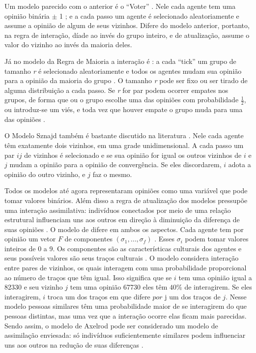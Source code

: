   Um modelo parecido com o anterior é o ``Voter'' \cite{holley1975ergodic}. Nele
  cada agente tem uma opinião binária \(\pm\) 1 ; e a cada passo um agente é
  selecionado aleatoriamente e assume a opinião de algum de seus vizinhos.
  Difere do modelo anterior, portanto, na regra de interação, díade ao invés do
  grupo inteiro, e de atualização, assume o valor do vizinho ao invés da maioria
  deles.


  Já no modelo da Regra de Maioria  a interação é : a cada
  ``tick'' um grupo de tamanho \textit{r} é selecionado aleatoriamente e todos
  os agentes mudam sua opinião para a opinião da maioria do grupo
  \cite{galam1990social,galam2012sociophysics}. O tamanho \textit{r} pode ser
  fixo ou ser tirado de alguma distribuição a cada passo. Se \textit{r} for par
  podem ocorrer empates nos grupos, de forma que ou o grupo escolhe uma das
  opiniões com probabilidade \(\frac{1}{2}\), ou introduz-se um viés, e toda vez
  que houver empate o grupo muda para uma das opiniões
  \cite{galam2012sociophysics, galam1986majority}.

  O Modelo Sznajd também é bastante discutido na literatura
  \cite{sznajd2000opinion, sirbu2017opinion,castellano2012social}. Nele cada
  agente têm exatamente dois vizinhos, em uma grade unidimensional. A cada passo
  um par $ij$ de vizinhos é selecionado e se sua opinião for igual os outros
  vizinhos de \(i\) e \(j\) mudam a opinião para a opinião de convergência. Se
  eles discordarem, \(i\) adota a opinião do outro vizinho, e \(j\) faz o mesmo.

  Todos os modelos até agora representaram opiniões como uma variável que pode
  tomar valores binários. Além disso a regra de atualização dos modelos
  pressupõe uma interação assimilativa: indivíduos conectados por meio de uma
  relação estrutural influenciam uns aos outros em direção à diminuição da
  diferença de suas opiniões \cite{flache2017}. O modelo de
   difere em ambos os aspectos. Cada agente
  tem por opinião um vetor $F$ de componentes $(\sigma_1 , \ldots, \sigma_f)$
  \cite{klemm2003role}. Esses $\sigma_i$ podem tomar valores inteiros de 0 a 9. Os
  componentes são as características culturais dos agentes e seus possíveis
  valores são seus traços culturais \cite{gomes2014}. O modelo considera
  interação entre pares de vizinhos, os quais interagem com uma probabilidade
  proporcional ao número de traços que têm igual. Isso significa que se \(i\)
  tem uma opinião igual a 82330 e seu vizinho \(j\) tem uma opinião 67730 eles
  têm \(40 \%\) de interagirem. Se eles interagirem, \(i\) troca um dos traços
  em que difere \(por\) j um dos traços de
  \(j\)\cite{axelrod1997dissemination}. Nesse modelo pessoas similares
  têm uma probabilidade maior de se interagirem do que pessoas distintas, mas
  uma vez que a interação ocorre elas ficam mais parecidas. Sendo assim, o
  modelo de Axelrod pode ser considerado um modelo de assimilação enviesada: só
  indivíduos suficientemente similares podem influenciar uns aos outros na
  redução de suas diferenças \cite{flache2017}.



